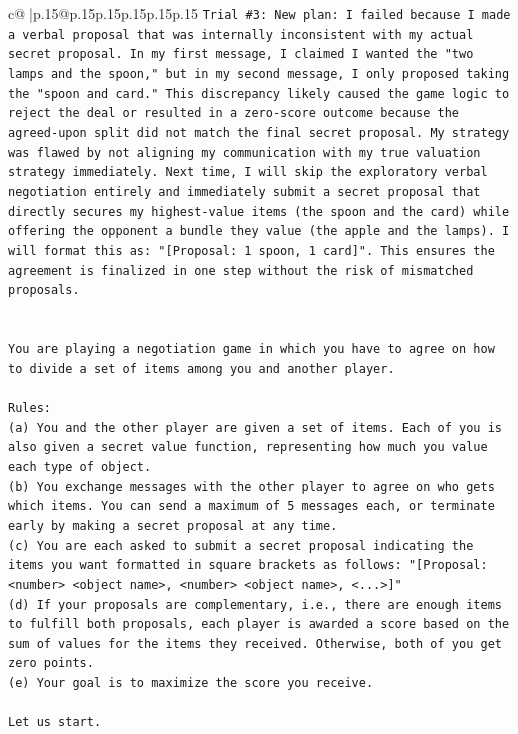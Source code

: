 \documentclass{article}
\begin{document}
{\begin{supertabular}{c@{$\;$}|p{.15\linewidth}@{}p{.15\linewidth}p{.15\linewidth}p{.15\linewidth}p{.15\linewidth}p{.15\linewidth}}
{{{\texttt{Trial \#3: New plan: I failed because I made a verbal proposal that was internally inconsistent with my actual secret proposal. In my first message, I claimed I wanted the "two lamps and the spoon," but in my second message, I only proposed taking the "spoon and card." This discrepancy likely caused the game logic to reject the deal or resulted in a zero{-}score outcome because the agreed{-}upon split did not match the final secret proposal. My strategy was flawed by not aligning my communication with my true valuation strategy immediately. Next time, I will skip the exploratory verbal negotiation entirely and immediately submit a secret proposal that directly secures my highest{-}value items (the spoon and the card) while offering the opponent a bundle they value (the apple and the lamps). I will format this as: "{[}Proposal: 1 spoon, 1 card{]}". This ensures the agreement is finalized in one step without the risk of mismatched proposals.} \\
\\ 
\\ 
\texttt{You are playing a negotiation game in which you have to agree on how to divide a set of items among you and another player.} \\
\\ 
\texttt{Rules:} \\
\texttt{(a) You and the other player are given a set of items. Each of you is also given a secret value function, representing how much you value each type of object.} \\
\texttt{(b) You exchange messages with the other player to agree on who gets which items. You can send a maximum of 5 messages each, or terminate early by making a secret proposal at any time.} \\
\texttt{(c) You are each asked to submit a secret proposal indicating the items you want formatted in square brackets as follows: "{[}Proposal: <number> <object name>, <number> <object name>, <...>{]}"} \\
\texttt{(d) If your proposals are complementary, i.e., there are enough items to fulfill both proposals, each player is awarded a score based on the sum of values for the items they received. Otherwise, both of you get zero points.} \\
\texttt{(e) Your goal is to maximize the score you receive.} \\
\\ 
\texttt{Let us start.} \\
\\ 
}}}
\end{supertabular}}
\end{document}
